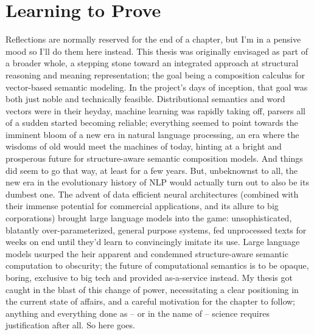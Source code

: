 \chapter{Learning to Prove}
\label{chapter:chapter_4}


\chapabstract{\todo}


Reflections are normally reserved for the end of a chapter, but I'm in a pensive mood so I'll do them here instead.
This thesis was originally envisaged as part of a broader whole, a stepping stone toward an integrated approach at structural reasoning and meaning representation; the goal being a composition calculus for vector-based semantic modeling.
In the project's days of inception, that goal was both just noble and technically feasible.
Distributional semantics and word vectors were in their heyday, machine learning was rapidly taking off, parsers all of a sudden started becoming reliable; everything seemed to point towards the imminent bloom of a new era in natural language processing, an era where the wisdoms of old would meet the machines of today, hinting at a bright and prosperous future for structure-aware semantic composition models.
And things did seem to go that way, at least for a few years.
But, unbeknownst to all, the new era in the evolutionary history of NLP would actually turn out to also be its dumbest one.
The advent of data efficient neural architectures (combined with their immense potential for commercial applications, and its allure to big corporations) brought large language models into the game: unsophisticated, blatantly over-parameterized, general purpose systems, fed unprocessed texts for weeks on end until they'd learn to convincingly imitate its use.
Large language models usurped the heir apparent and condemned structure-aware semantic computation to obscurity; the future of computational semantics is to be opaque, boring, exclusive to big tech and provided as-a-service instead.
My thesis got caught in the blast of this change of power, necessitating a clear positioning in the current state of affairs, and a careful motivation for the chapter to follow; anything and everything done as -- or in the name of -- science requires justification after all.
So here goes.

